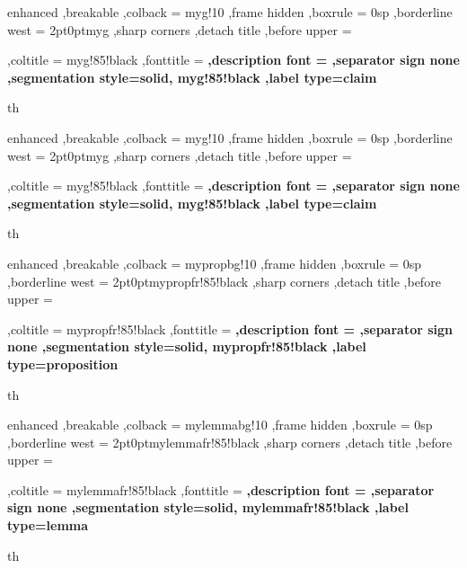 
{%
	enhanced
	,breakable
	,colback = myg!10
	,frame hidden
	,boxrule = 0sp
	,borderline west = {2pt}{0pt}{myg}
	,sharp corners
	,detach title
	,before upper = \tcbtitle\par\smallskip
	,coltitle = myg!85!black
	,fonttitle = \bfseries\sffamily
	,description font = \mdseries
	,separator sign none
	,segmentation style={solid, myg!85!black}
	,label type=claim
}
{th}


{%
	enhanced
	,breakable
	,colback = myg!10
	,frame hidden
	,boxrule = 0sp
	,borderline west = {2pt}{0pt}{myg}
	,sharp corners
	,detach title
	,before upper = \tcbtitle\par\smallskip
	,coltitle = myg!85!black
	,fonttitle = \bfseries\sffamily
	,description font = \mdseries
	,separator sign none
	,segmentation style={solid, myg!85!black}
	,label type=claim
}
{th}

{%
	enhanced
	,breakable
	,colback = mypropbg!10
	,frame hidden
	,boxrule = 0sp
	,borderline west = {2pt}{0pt}{mypropfr!85!black}
	,sharp corners
	,detach title
	,before upper = \tcbtitle\par\smallskip
	,coltitle = mypropfr!85!black
	,fonttitle = \bfseries\sffamily
	,description font = \mdseries
	,separator sign none
	,segmentation style={solid, mypropfr!85!black}
	,label type=proposition
}
{th}


{%
	enhanced
	,breakable
	,colback = mylemmabg!10
	,frame hidden
	,boxrule = 0sp
	,borderline west = {2pt}{0pt}{mylemmafr!85!black}
	,sharp corners
	,detach title
	,before upper = \tcbtitle\par\smallskip
	,coltitle = mylemmafr!85!black
	,fonttitle = \bfseries\sffamily
	,description font = \mdseries
	,separator sign none
	,segmentation style={solid, mylemmafr!85!black}
	,label type=lemma
}
{th}

